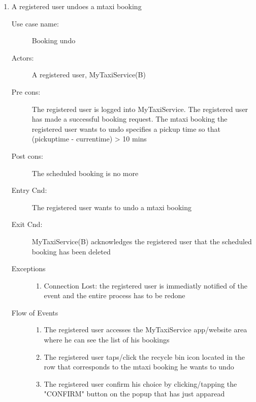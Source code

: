\documentclass[11pt]{article} %
\begin{document}
\begin{enumerate}
	
	       \item A registered user undoes a mtaxi booking
		\begin{description}
		        \item [Use case name:] Booking undo
		        \item [Actors:] A registered user, MyTaxiService(B)
		        \item [Pre cons:] The registered user is logged into MyTaxiService. The registered user
		        has made a successful booking request. The mtaxi booking the registered user wants to undo
		        specifies a pickup time so that (pickuptime - currentime) > 10 mins
		        \item [Post cons:] The scheduled booking is no more
		        \item [Entry Cnd:] The registered user wants to undo a mtaxi booking
		        \item [Exit Cnd:] MyTaxiService(B) acknowledges the registered user that the scheduled booking
		        has been deleted
		        \item [Exceptions]\hfill
			\begin{enumerate}
			          \item Connection Lost: the registered user is immediatly notified of the event and the entire process
			          has to be redone
			\end{enumerate}
		        \item [Flow of Events]\hfill
			\begin{enumerate}
			          \item The registered user accesses the MyTaxiService app/website area where he can see the list of his bookings
			          \item The registered user taps/click the recycle bin icon located in the row that corresponds to the mtaxi booking
			          he wants to undo
			          \item The registered user confirm his choice by clicking/tapping the "CONFIRM" button on
			          the popup that has just apparead
			\end{enumerate}
		\end{description}
	

\end{enumerate}
\end{document}
